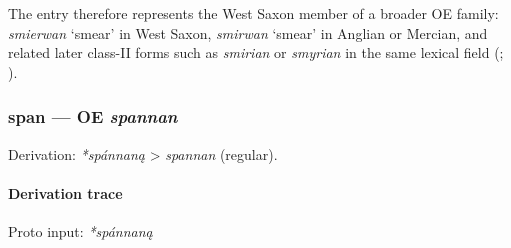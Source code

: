 \documentclass[
  british,
  a4paper,
]{article}
\begin{document}
The entry therefore represents the West Saxon member of a broader OE
family: {\emph{smierwan}} `smear' in West Saxon, {\emph{smirwan}}
`smear' in Anglian or Mercian, and related later class-II forms such as
\emph{smirian} or \emph{smyrian} in the same lexical field
(;
).

\subsubsection{\texorpdfstring{span --- OE
\emph{spannan}}{span --- OE spannan}}\label{span-oe-spannan}

Derivation: \emph{*spánnaną} \textgreater{} \emph{spannan} (regular).

\paragraph{Derivation trace}\label{derivation-trace-56}

Proto input: \emph{*spánnaną}

\begingroup
\setlength{\fboxsep}{6pt}
\end{document}
